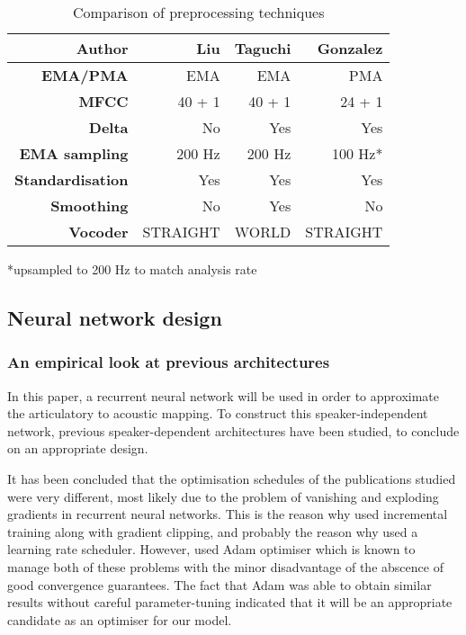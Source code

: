 \documentclass[a4paper]{article}
\begin{document}
\begin{table}[th]
  \caption{Comparison of preprocessing techniques}
  \label{tab:example}
  \centering
  \footnotesize
  \begin{tabular}{ r r r r }
    \toprule
    \textbf{Author} & \textbf{Liu} & \textbf{Taguchi} & \textbf{Gonzalez} \\
    \midrule
    \textbf{EMA/PMA} & EMA & EMA & PMA \\
    \textbf{MFCC} & 40 + 1 & 40 + 1 & 24 + 1 \\
    \textbf{Delta} & No & Yes & Yes \\
    \textbf{EMA sampling} & 200 Hz & 200 Hz & 100 Hz* \\
    \textbf{Standardisation} & Yes & Yes & Yes \\
    \textbf{Smoothing} & No & Yes  & No \\
    \textbf{Vocoder} & STRAIGHT \cite{Kawahara2006} & WORLD  & STRAIGHT \\
    \bottomrule
  \end{tabular}
  *upsampled to 200 Hz to match analysis rate
\end{table}

\subsection{Neural network design} \label{section:nnexperiment}

\subsubsection{An empirical look at previous architectures}

In this paper, a recurrent neural network will be used in order to
approximate the articulatory to acoustic mapping. To construct
this speaker-independent network, previous speaker-dependent architectures
have been studied, to conclude on an appropriate design.

It has been concluded that the optimisation schedules of the publications
studied were very different, most likely due to the problem of vanishing and
exploding gradients in recurrent neural networks.
This is the reason why \cite{Taguchi} used incremental
training along with gradient clipping, and probably the reason why \cite{Liu2018} used a learning rate
scheduler. However, \cite{Gonzalez2017} used Adam optimiser \cite{Kingma2015}
which is known to manage both of these problems with the minor disadvantage of
the abscence of good convergence guarantees. The fact that Adam was able
to obtain similar results without careful parameter-tuning indicated that
it will be an appropriate candidate as an optimiser for our model. 
\end{document}
